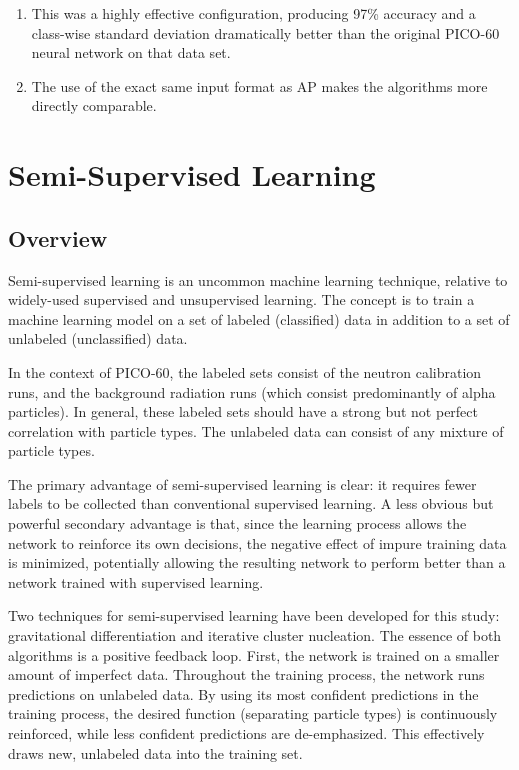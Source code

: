 \documentclass[10pt]{article}
\begin{document}
\begin{enumerate}
    \item This was a highly effective configuration, producing 97\% accuracy and a class-wise standard deviation dramatically better than the original PICO-60 neural network on that data set.
    \item The use of the exact same input format as AP makes the algorithms more directly comparable.
\end{enumerate}

\section{Semi-Supervised Learning} \label{semi_supervised}

\subsection{Overview}

Semi-supervised learning is an uncommon machine learning technique, relative to widely-used supervised and unsupervised learning. The concept is to train a machine learning model on a set of labeled (classified) data in addition to a set of unlabeled (unclassified) data.

In the context of PICO-60, the labeled sets consist of the neutron calibration runs, and the background radiation runs (which consist predominantly of alpha particles). In general, these labeled sets should have a strong but not perfect correlation with particle types. The unlabeled data can consist of any mixture of particle types.

The primary advantage of semi-supervised learning is clear: it requires fewer labels to be collected than conventional supervised learning. A less obvious but powerful secondary advantage is that, since the learning process allows the network to reinforce its own decisions, the negative effect of impure training data is minimized, potentially allowing the resulting network to perform better than a network trained with supervised learning.

Two techniques for semi-supervised learning have been developed for this study: gravitational differentiation and iterative cluster nucleation. The essence of both algorithms is a positive feedback loop. First, the network is trained on a smaller amount of imperfect data. Throughout the training process, the network runs predictions on unlabeled data. By using its most confident predictions in the training process, the desired function (separating particle types) is continuously reinforced, while less confident predictions are de-emphasized. This effectively draws new, unlabeled data into the training set.
\end{document}
